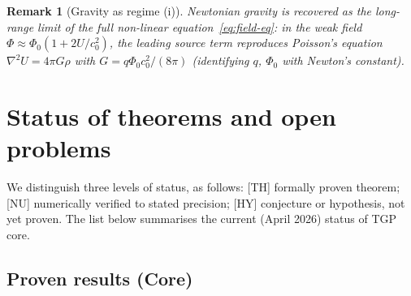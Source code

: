 \documentclass[11pt,a4paper]{article}
\renewcommand{\Phi}{\varPhi}
\newcommand{\PhiZero}{\varPhi_{0}}
\newtheorem{remark}[axiom]{Remark}
\begin{document}
\begin{remark}[Gravity as regime (i)]
Newtonian gravity is recovered as the long-range limit of the full
non-linear equation~\eqref{eq:field-eq}: in the weak field
$\Phi\approx\PhiZero(1+2U/c_{0}^{2})$, the leading source term reproduces
Poisson's equation $\nabla^{2}U=4\pi G\rho$ with
$G=q\PhiZero c_{0}^{2}/(8\pi)$ (identifying $q$, $\PhiZero$ with
Newton's constant).
\end{remark}

\section{Status of theorems and open problems}\label{sec:status}

We distinguish three levels of status, as follows:
\textsf{[TH]} formally proven theorem;
\textsf{[NU]} numerically verified to stated precision;
\textsf{[HY]} conjecture or hypothesis, not yet proven.
The list below summarises the current (April 2026) status of TGP core.

\subsection{Proven results (Core)}
\end{document}
